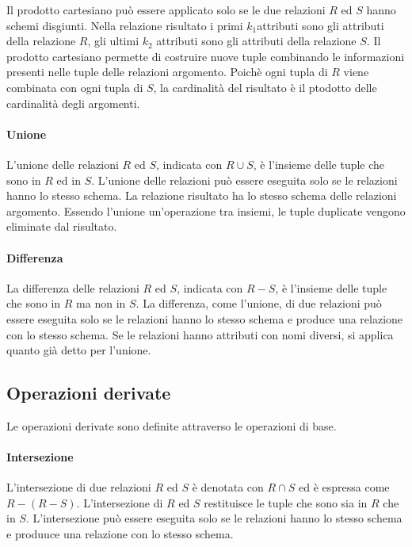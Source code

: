 Il prodotto cartesiano può essere applicato solo se le due relazioni $R$ ed $S$
hanno schemi disgiunti. Nella relazione risultato i primi $k_1$attributi sono
gli attributi della relazione $R$, gli ultimi $k_2$ attributi sono gli attributi
della relazione $S$.
Il prodotto cartesiano permette di costruire nuove tuple combinando le
informazioni presenti nelle tuple delle relazioni argomento.
Poichè ogni tupla di $R$ viene combinata con ogni tupla di $S$, la cardinalità
del risultato è il ptodotto delle cardinalità degli argomenti.

\paragraph{Unione}%
\label{par:Unione}
L'unione delle relazioni $R$ ed $S$, indicata con $R\cup S$, è l'insieme delle
tuple che sono in $R$ ed in $S$.
L'unione delle relazioni può essere eseguita solo se le relazioni hanno lo
stesso schema.
La relazione risultato ha lo stesso schema delle relazioni argomento.
Essendo l'unione un'operazione tra insiemi, le tuple duplicate vengono eliminate
dal risultato.

\paragraph{Differenza}%
\label{par:Differenza}
La differenza delle relazioni $R$ ed $S$, indicata con $R-S$, è l'insieme delle
tuple che sono in $R$ ma non in $S$.
La differenza, come l'unione, di due relazioni può essere eseguita solo se le
relazioni hanno lo stesso schema e produce una relazione con lo stesso schema.
Se le relazioni hanno attributi con nomi diversi, si applica quanto già detto
per l'unione.

\subsection{Operazioni derivate}%
\label{sub:Operazioni derivate}
Le operazioni derivate sono definite attraverso le operazioni di base.

\paragraph{Intersezione}%
\label{par:Intersezione}
L'intersezione di due relazioni $R$ ed $S$ è denotata con $R\cap S$ ed è
espressa come $R-(R-S)$.
L'intersezione di $R$ ed $S$ restituisce le tuple che sono sia in $R$ che in
$S$. L'intersezione può essere eseguita solo se le relazioni hanno lo stesso
schema e produuce una relazione con lo stesso schema.

